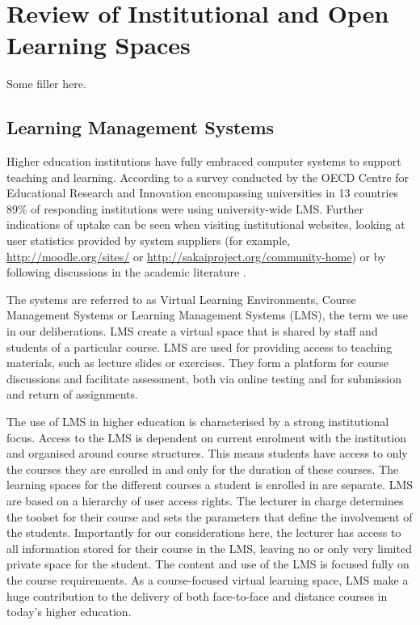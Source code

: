 \chapter{Review of Institutional and Open Learning Spaces \label{cha:systudy}}

Some filler here.

\section{Learning Management Systems}
Higher education institutions have fully embraced computer systems to support
teaching and learning. According to a survey conducted by the OECD Centre for
Educational Research and Innovation encompassing universities in 13 countries
89\% of responding institutions were using university-wide LMS. Further
indications of uptake can be seen when visiting institutional websites, looking
at user statistics provided by system suppliers (for example,
\url{http://moodle.org/sites/} or
\url{http://sakaiproject.org/community-home}) or by following discussions in
the academic literature \citep{Browne2006,Collis2004}.

The systems are referred to as Virtual Learning Environments, Course Management
Systems or Learning Management Systems (LMS), the term we use in our
deliberations. LMS create a virtual space that is shared by staff and students
of a particular course. LMS are used for providing access to teaching materials,
such as lecture slides or exercises. They form a platform for course discussions
and facilitate assessment, both via online testing and for submission and return
of assignments.

The use of LMS in higher education is characterised by a strong institutional
focus. Access to the LMS is dependent on current enrolment with the institution
and organised around course structures. This means students have access to only
the courses they are enrolled in and only for the duration of these courses. The
learning spaces for the different courses a student is enrolled in are separate.
LMS are based on a hierarchy of user access rights. The lecturer in charge
determines the toolset for their course and sets the parameters that define the
involvement of the students. Importantly for our considerations here, the
lecturer has access to all information stored for their course in the LMS,
leaving no or only very limited private space for the student. The content and
use of the LMS is focused fully on the course requirements. As a course-focused
virtual learning space, LMS make a huge contribution to the delivery of both
face-to-face and distance courses in today's higher education.

